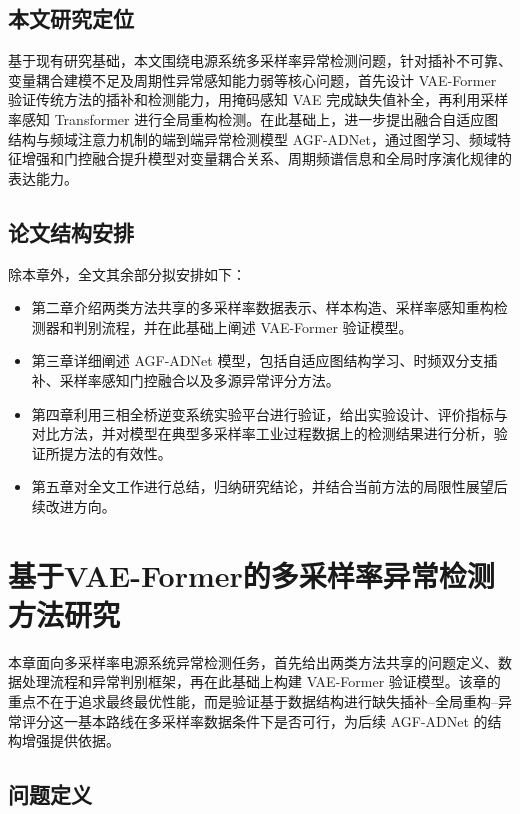 \documentclass[bachelor, vlined]{DissertUESTC}
\begin{document}
	\section{本文研究定位}
	基于现有研究基础，本文围绕电源系统多采样率异常检测问题，针对插补不可靠、变量耦合建模不足及周期性异常感知能力弱等核心问题，首先设计 VAE-Former 验证传统方法的插补和检测能力，用掩码感知 VAE 完成缺失值补全，再利用采样率感知 Transformer 进行全局重构检测。在此基础上，进一步提出融合自适应图结构与频域注意力机制的端到端异常检测模型 AGF-ADNet，通过图学习、频域特征增强和门控融合提升模型对变量耦合关系、周期频谱信息和全局时序演化规律的表达能力。
    \section{论文结构安排}
    除本章外，全文其余部分拟安排如下：
    \begin{itemize}
        \item 第二章介绍两类方法共享的多采样率数据表示、样本构造、采样率感知重构检测器和判别流程，并在此基础上阐述 VAE-Former 验证模型。
        \item 第三章详细阐述 AGF-ADNet 模型，包括自适应图结构学习、时频双分支插补、采样率感知门控融合以及多源异常评分方法。
        \item 第四章利用三相全桥逆变系统实验平台进行验证，给出实验设计、评价指标与对比方法，并对模型在典型多采样率工业过程数据上的检测结果进行分析，验证所提方法的有效性。
        \item 第五章对全文工作进行总结，归纳研究结论，并结合当前方法的局限性展望后续改进方向。
    \end{itemize}

    \chapter{基于VAE-Former的多采样率异常检测方法研究}

    本章面向多采样率电源系统异常检测任务，首先给出两类方法共享的问题定义、数据处理流程和异常判别框架，再在此基础上构建 VAE-Former 验证模型。该章的重点不在于追求最终最优性能，而是验证基于数据结构进行缺失插补--全局重构--异常评分这一基本路线在多采样率数据条件下是否可行，为后续 AGF-ADNet 的结构增强提供依据。

    \section{问题定义}
\end{document}
